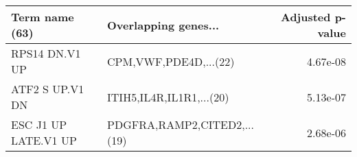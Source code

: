 \begin{tabular}{llr}
\toprule
      Term name (63) &        Overlapping genes... &  Adjusted p-value \\
\midrule
      RPS14 DN.V1 UP &       CPM,VWF,PDE4D,...(22) &          4.67e-08 \\
     ATF2 S UP.V1 DN &    ITIH5,IL4R,IL1R1,...(20) &          5.13e-07 \\
ESC J1 UP LATE.V1 UP & PDGFRA,RAMP2,CITED2,...(19) &          2.68e-06 \\
\bottomrule
\end{tabular}
